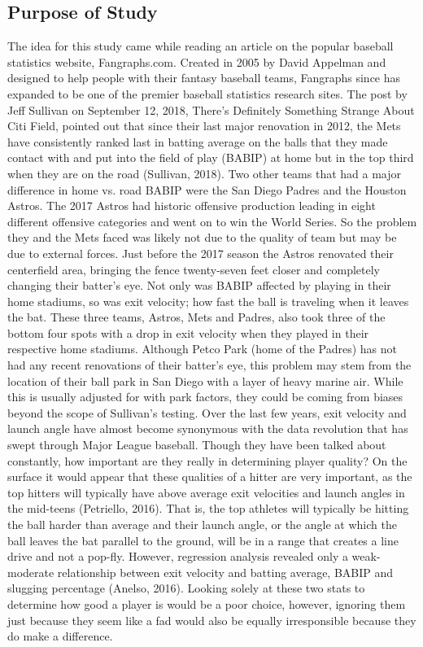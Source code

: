 \documentclass{article}
\begin{document}
\begin{doublespace}
\section{Purpose of Study}
The idea for this study came while reading an article on the popular baseball statistics website, Fangraphs.com. Created in 2005 by David Appelman and designed to help people with their fantasy baseball teams, Fangraphs since has expanded to be one of the premier baseball statistics research sites. The post by Jeff Sullivan on September 12, 2018, There’s Definitely Something Strange About Citi Field, pointed out that since their last major renovation in 2012, the Mets have consistently ranked last in batting average on the balls that they made contact with and put into the field of play (BABIP) at home but in the top third when they are on the road (Sullivan, 2018). Two other teams that had a major difference in home vs. road BABIP were the San Diego Padres and the Houston Astros. The 2017 Astros had historic offensive production leading in eight different offensive categories and went on to win the World Series. So the problem they and the Mets faced was likely not due to the quality of team but may be due to external forces. Just before the 2017 season the Astros renovated their centerfield area, bringing the fence twenty-seven feet closer and completely changing their batter’s eye. Not only was BABIP affected by playing in their home stadiums, so was exit velocity; how fast the ball is traveling when it leaves the bat. These three teams, Astros, Mets and Padres, also took three of the bottom four spots with a drop in exit velocity when they played in their respective home stadiums. Although Petco Park (home of the Padres) has not had any recent renovations of their batter’s eye, this problem may stem from the location of their ball park in San Diego with a layer of heavy marine air. While this is usually adjusted for with park factors, they could be coming from biases beyond the scope of Sullivan’s testing. 
Over the last few years, exit velocity and launch angle have almost become synonymous with the data revolution that has swept through Major League baseball. Though they have been talked about constantly, how important are they really in determining player quality? On the surface it would appear that these qualities of a hitter are very important, as the top hitters will typically have above average exit velocities and launch angles in the mid-teens (Petriello, 2016). That is, the top athletes will typically be hitting the ball harder than average and their launch angle, or the angle at which the ball leaves the bat parallel to the ground, will be in a range that creates a line drive and not a pop-fly. However, regression analysis revealed only a weak-moderate relationship between exit velocity and batting average, BABIP and slugging percentage (Anelso, 2016). Looking solely at these two stats to determine how good a player is would be a poor choice, however, ignoring them just because they seem like a fad would also be equally irresponsible because they do make a difference. 

\end{doublespace}
\end{document}
